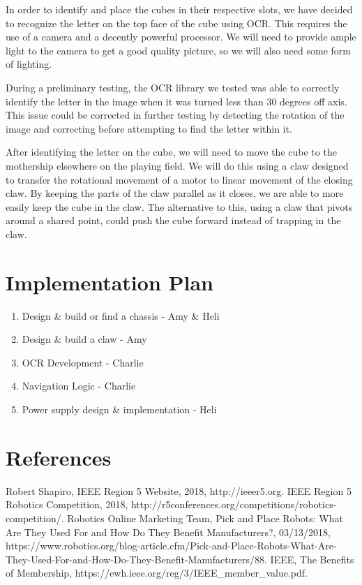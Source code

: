 \documentclass[12pt]{article}
\begin{document}
In order to identify and place the cubes in their respective slots, we have decided to recognize the letter on the top face of the cube using OCR. This requires the use of a camera and a decently powerful processor. We will need to provide ample light to the camera to get a good quality picture, so we will also need some form of lighting. 

During a preliminary testing, the OCR library we tested was able to correctly identify the letter in the image when it was turned less than 30 degrees off axis. This issue could be corrected in further testing by detecting the rotation of the image and correcting before attempting to find the letter within it.

After identifying the letter on the cube, we will need to move the cube to the mothership elsewhere on the playing field. We will do this using a claw designed to transfer the rotational movement of a motor to linear movement of the closing claw. By keeping the parts of the claw parallel as it closes, we are able to more easily keep the cube in the claw. The alternative to this, using a claw that pivots around a shared point, could push the cube forward instead of trapping in the claw.

\section{Implementation Plan}

\begin{enumerate}[noitemsep]
	\item Design \& build or find a chassis - Amy \& Heli
	\item Design \& build a claw - Amy
	\item OCR Development - Charlie
	\item Navigation Logic - Charlie
	\item Power supply design \& implementation - Heli
\end{enumerate}

\section{References}
\begin{thebibliography}{4}
	Robert Shapiro, IEEE Region 5 Website, 2018, http://ieeer5.org.
	IEEE Region 5 Robotics Competition, 2018, http://r5conferences.org/competitions/robotics-competition/.
	Robotics Online Marketing Team, Pick and Place Robots: What Are They Used For and How Do They Benefit Manufacturers?, 03/13/2018, https://www.robotics.org/blog-article.cfm/Pick-and-Place-Robots-What-Are-They-Used-For-and-How-Do-They-Benefit-Manufacturers/88.
	IEEE, The Benefits of Membership, https://ewh.ieee.org/reg/3/IEEE\_member\_value.pdf.
	
\end{thebibliography}
\end{document}
